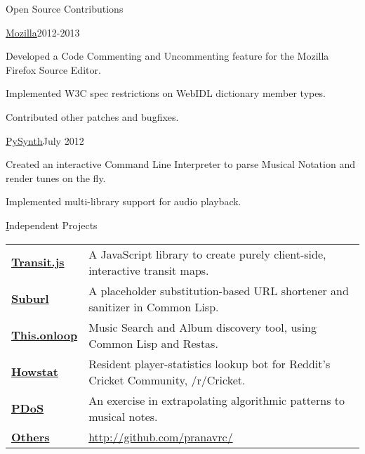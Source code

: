 \documentclass{resume} %
\begin{document}
\begin{rSection}{Open Source Contributions}

\begin{rSubsection}{\href{https://bugzilla.mozilla.org/user\%5Fprofile?user\%5Fid=431664}{Mozilla}}{2012-2013}{}{}
\item Developed a Code Commenting and Uncommenting feature for the Mozilla Firefox Source Editor.
\item Implemented W3C spec restrictions on WebIDL dictionary member types.
\item Contributed other patches and bugfixes.
\end{rSubsection}

\begin{rSubsection}{\href{https://github.com/mdoege/PySynth/commits?author=pranavrc}{PySynth}}{July 2012}{}{}
\item Created an interactive Command Line Interpreter to parse Musical Notation and render tunes on the fly.
\item Implemented multi-library support for audio playback.
\end{rSubsection}

\end{rSection}


\begin{rSection}{{\href{http://github.com/pranavrc/}Independent Projects}}

\begin{tabular}{ @{} >{\bfseries}l @{\hspace{6ex}} l }
\href{http://onloop.net/transit/}{Transit.js} & A JavaScript library to create purely client-side, interactive transit maps. \\
\href{http://u.onloop.net/}{Suburl} & A placeholder substitution-based URL shortener and sanitizer in Common Lisp. \\
\href{http://this.onloop.net/}{This.onloop} & Music Search and Album discovery tool, using Common Lisp and Restas. \\
\href{http://redd.it/1i7lh3}{Howstat} & Resident player-statistics lookup bot for Reddit's Cricket Community, /r/Cricket. \\
\href{http://music.onloop.net}{PDoS} & An exercise in extrapolating algorithmic patterns to musical notes. \\
\href{http://github.com/pranavrc/}{Others} & \href{http://github.com/pranavrc/}{http://github.com/pranavrc/}
\end{tabular}

\end{rSection}
\end{document}
